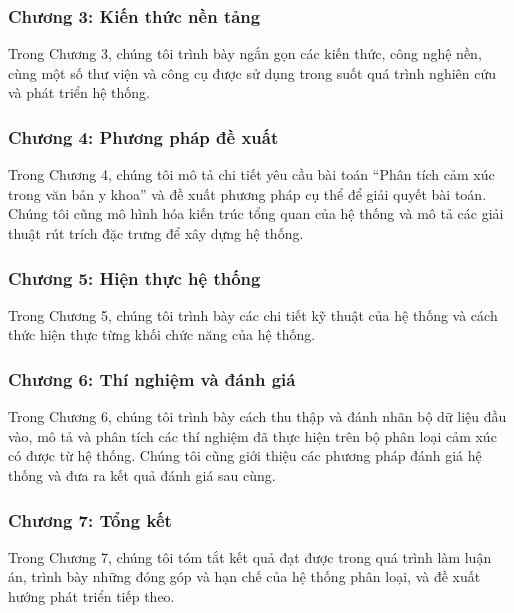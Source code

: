 \subsubsection*{Chương 3: Kiến thức nền tảng}
Trong Chương 3, chúng tôi trình bày ngắn gọn các kiến thức, công nghệ nền, cùng một số thư viện và công cụ được sử dụng trong suốt quá trình nghiên cứu và phát triển hệ thống.
\subsubsection*{Chương 4: Phương pháp đề xuất}
Trong Chương 4, chúng tôi mô tả chi tiết yêu cầu bài toán ``Phân tích cảm xúc trong văn bản y khoa'' và đề xuất phương pháp cụ thể để giải quyết bài toán. Chúng tôi cũng mô hình hóa kiến trúc tổng quan của hệ thống và mô tả các giải thuật rút trích đặc trưng để xây dựng hệ thống.
\subsubsection*{Chương 5: Hiện thực hệ thống}
Trong Chương 5, chúng tôi trình bày các chi tiết kỹ thuật của hệ thống và cách thức hiện thực từng khối chức năng của hệ thống.
\subsubsection*{Chương 6: Thí nghiệm và đánh giá}
Trong Chương 6, chúng tôi trình bày cách thu thập và đánh nhãn bộ dữ liệu đầu vào, mô tả và phân tích các thí nghiệm đã thực hiện trên bộ phân loại cảm xúc có được từ hệ thống. Chúng tôi cũng giới thiệu các phương pháp đánh giá hệ thống và đưa ra kết quả đánh giá sau cùng.
\subsubsection*{Chương 7: Tổng kết}
Trong Chương 7, chúng tôi tóm tắt kết quả đạt được trong quá trình làm luận án, trình bày những đóng góp và hạn chế của hệ thống phân loại, và đề xuất hướng phát triển tiếp theo.
